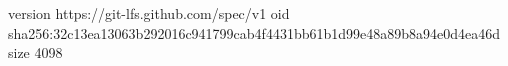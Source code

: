 version https://git-lfs.github.com/spec/v1
oid sha256:32c13ea13063b292016c941799cab4f4431bb61b1d99e48a89b8a94e0d4ea46d
size 4098
